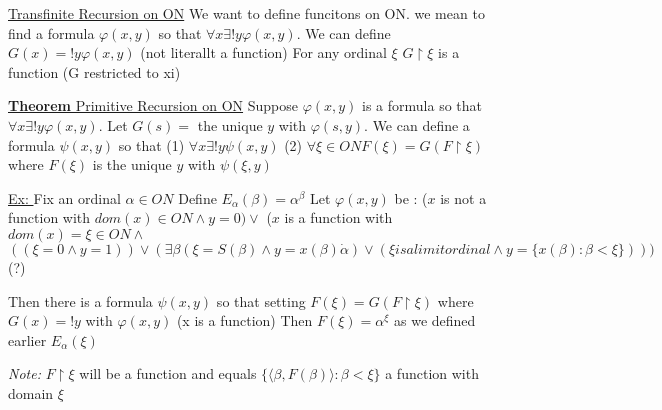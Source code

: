 \documentclass{article}
\newcommand{\set}[1]{\{#1\}}
\begin{document}
    \underline{Transfinite Recursion on ON}
    We want to define funcitons on ON.
    we mean to find a formula $\varphi(x,y)$ so that $\forall x \exists! y \varphi(x,y)$.
    We can define $G(x) = !y \varphi(x,y)$ (not literallt a function)
    For any ordinal $\xi$ $G \upharpoonright \xi$ is a function (G restricted to xi)

    \underline{\textbf{Theorem} Primitive Recursion on ON}
    Suppose $\varphi(x,y)$ is a formula so that $\forall x \exists! y \varphi(x,y)$.
    Let $G(s) = $ the unique $y$ with $\varphi(s,y)$.
    We can define a formula $\psi(x,y)$ so that
    (1) $\forall x \exists! y \psi(x,y)$
    (2) $\forall \xi \in ON F(\xi) = G(F \upharpoonright \xi)$ where $F(\xi)$ is the unique $y$ with $\psi(\xi, y)$

    \underline{Ex: } Fix an ordinal $\alpha \in ON$
    Define $E_\alpha(\beta) = \alpha^\beta$
    Let $\varphi(x,y)$ be :
    ($x$ is not a function with $dom(x) \in ON \wedge y = 0 ) \vee$
    ($x$ is a function with $dom(x) = \xi \in ON \wedge$
    $((\xi = 0 \wedge y=1)) \vee (\exists \beta (\xi = S(\beta) \wedge y = x(\beta) \dot \alpha) \vee (\xi is a limit ordinal \wedge y = \set{x(\beta) : \beta < \xi})))$ (?)

    Then there is a formula $\psi(x,y)$ so that setting $F(\xi) = G(F \upharpoonright \xi)$ where $G(x) = !y$ with $\varphi(x,y)$ (x is a function)
    Then $F(\xi) = \alpha^\xi$ as we defined earlier $E_\alpha(\xi)$

    \emph{Note: } $F \upharpoonright \xi$ will be a function and equals $\set{\langle \beta ,F(\beta) \rangle : \beta < \xi}$ a function with domain $\xi$
\end{document}
